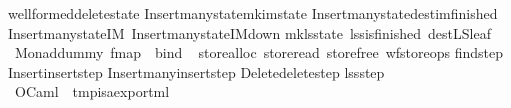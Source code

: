 \begin{isabellebody}
wellformed{\isacharunderscore}delete{\isacharunderscore}state\isanewline
\isanewline
Insert{\isacharunderscore}many{\isacharunderscore}state{\isachardot}mk{\isacharunderscore}im{\isacharunderscore}state\isanewline
Insert{\isacharunderscore}many{\isacharunderscore}state{\isachardot}dest{\isacharunderscore}im{\isacharunderscore}finished\isanewline
Insert{\isacharunderscore}many{\isacharunderscore}state{\isachardot}IM{}\ Insert{\isacharunderscore}many{\isacharunderscore}state{\isachardot}IM{\isacharunderscore}down\isanewline
\isanewline
\isanewline
\isanewline
mk{\isacharunderscore}ls{\isacharunderscore}state\ lss{\isacharunderscore}is{\isacharunderscore}finished\ dest{\isacharunderscore}LS{\isacharunderscore}leaf\ \isanewline
\isanewline
\isanewline
\ Monad{\isachardot}dummy\ fmap\ \ bind\isanewline
\isanewline
\ \isanewline
store{\isacharunderscore}alloc\ store{\isacharunderscore}read\ store{\isacharunderscore}free\ wf{\isacharunderscore}store{\isacharunderscore}ops\isanewline
\isanewline
\isanewline
find{\isacharunderscore}step\isanewline
\isanewline
\isanewline
Insert{\isachardot}insert{\isacharunderscore}step\isanewline
\isanewline
\isanewline
Insert{\isacharunderscore}many{\isachardot}insert{\isacharunderscore}step\isanewline
\isanewline
\isanewline
Delete{}{\isachardot}delete{\isacharunderscore}step\isanewline
\isanewline
\isanewline
lss{\isacharunderscore}step\isanewline
\isanewline
\isanewline
{}\ OCaml\ \ {\isachardoublequoteopen}{\isacharslash}tmp{\isacharslash}isa{\isacharunderscore}export{\isachardot}ml{\isachardoublequoteclose}\isanewline
\isanewline
\isanewline
\isanewline
\isanewline
\isanewline
\isanewline
\isanewline
\isanewline
\isanewline
%
\isadelimtheory
\isanewline
%
\endisadelimtheory
%
\isatagtheory
{}\isamarkupfalse%
%
\endisatagtheory
{\isafoldtheory}%
%
\isadelimtheory
%
\endisadelimtheory
\end{isabellebody}%

